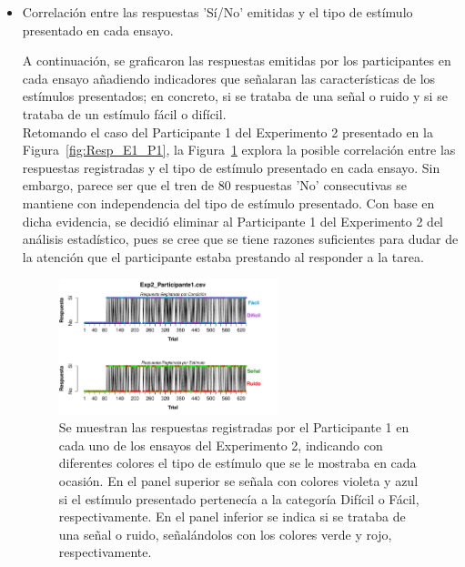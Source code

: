 \begin{itemize}
Las gráficas correspondientes al resto de los participantes en los Experimentos 1 y 2, se muestran en las Figuras~\ref{fig:Response_P1} y \ref{fig:Response_E2}, respectivamente.\\

\item Correlación entre las respuestas 'Sí/No' emitidas y el tipo de estímulo presentado en cada ensayo.

A continuación, se graficaron las respuestas emitidas por los participantes en cada ensayo añadiendo indicadores que señalaran las características de los estímulos presentados; en concreto, si se trataba de una señal o ruido y si se trataba de un estímulo fácil o difícil.\\ 

Retomando el caso del Participante 1 del Experimento 2 presentado en la Figura~\ref{fig:Resp_E1_P1}, la Figura~\ref{fig:BiasResp_E1_P1} explora la posible correlación entre las respuestas registradas y el tipo de estímulo presentado en cada ensayo. Sin embargo, parece ser que el tren de 80 respuestas 'No' consecutivas se mantiene con independencia del tipo de estímulo presentado. Con base en dicha evidencia, se decidió eliminar al Participante 1 del Experimento 2 del análisis estadístico, pues se cree que se tiene razones suficientes para dudar de la atención que el participante estaba prestando al responder a la tarea.\\

\begin{figure}[th]
\centering
\includegraphics[width=0.60\textwidth]{Figures/BiasResp_Exp2_P1} 
\caption[Respuesta por Tipo de Estimulo; ejemplo de participante sesgado]{Se muestran las respuestas registradas por el Participante 1 en cada uno de los ensayos del Experimento 2, indicando con diferentes colores el tipo de estímulo que se le mostraba en cada ocasión. En el panel superior se señala con colores violeta y azul si el estímulo presentado pertenecía a la categoría Difícil o Fácil, respectivamente. En el panel inferior se indica si se trataba de una señal o ruido, señalándolos con los colores verde y rojo, respectivamente.}
\label{fig:BiasResp_E1_P1}
\end{figure}


\end{itemize}
